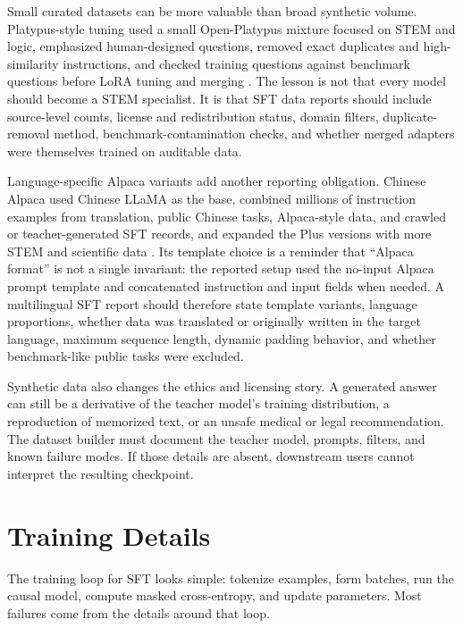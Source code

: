 Small curated datasets can be more valuable than broad synthetic volume. Platypus-style tuning used a small Open-Platypus mixture focused on STEM and logic, emphasized human-designed questions, removed exact duplicates and high-similarity instructions, and checked training questions against benchmark questions before LoRA tuning and merging \cite{lee2023platypus}. The lesson is not that every model should become a STEM specialist. It is that SFT data reports should include source-level counts, license and redistribution status, domain filters, duplicate-removal method, benchmark-contamination checks, and whether merged adapters were themselves trained on auditable data.

Language-specific Alpaca variants add another reporting obligation. Chinese Alpaca used Chinese LLaMA as the base, combined millions of instruction examples from translation, public Chinese tasks, Alpaca-style data, and crawled or teacher-generated SFT records, and expanded the Plus versions with more STEM and scientific data \cite{cui2023efficient}. Its template choice is a reminder that ``Alpaca format'' is not a single invariant: the reported setup used the no-input Alpaca prompt template and concatenated instruction and input fields when needed. A multilingual SFT report should therefore state template variants, language proportions, whether data was translated or originally written in the target language, maximum sequence length, dynamic padding behavior, and whether benchmark-like public tasks were excluded.

Synthetic data also changes the ethics and licensing story. A generated answer can still be a derivative of the teacher model's training distribution, a reproduction of memorized text, or an unsafe medical or legal recommendation. The dataset builder must document the teacher model, prompts, filters, and known failure modes. If those details are absent, downstream users cannot interpret the resulting checkpoint.

\section{Training Details}
\label{sec:sft-training-details}

The training loop for SFT looks simple: tokenize examples, form batches, run the causal model, compute masked cross-entropy, and update parameters. Most failures come from the details around that loop.

